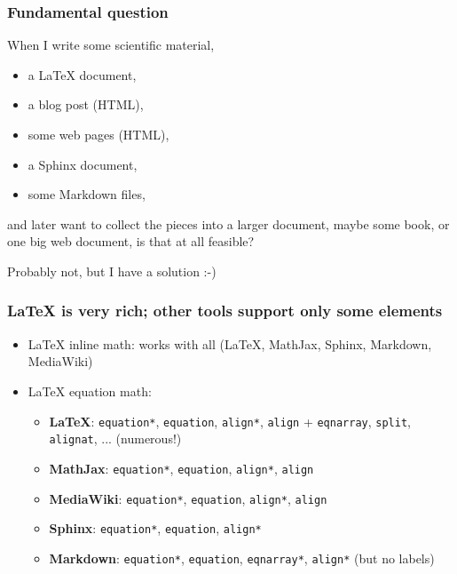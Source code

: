\documentclass{beamer}
\begin{document}
\begin{frame}
\frametitle{Fundamental question}

When I write some scientific material,

\begin{itemize}
 \item a {\LaTeX} document,

 \item a blog post (HTML),

 \item some web pages (HTML),

 \item a Sphinx document,

 \item some Markdown files,
\end{itemize}

\noindent
and later want to collect the pieces into a larger document, maybe
some book, or one big web document, is that at all feasible?

\pause
Probably not, but I have a solution :-)
\end{frame}

\begin{frame}
\frametitle{{\LaTeX} is very rich; other tools support only some elements}

\begin{itemize}
 \item {\LaTeX} inline math: works with all ({\LaTeX}, MathJax, Sphinx, Markdown, MediaWiki)

 \item {\LaTeX} equation math:
\begin{itemize}

    \item \textbf{LaTeX}: \texttt{equation*}, \texttt{equation}, \texttt{align*}, \texttt{align} + \texttt{eqnarray}, \texttt{split}, \texttt{alignat}, ... (numerous!)

    \item \textbf{MathJax}: \texttt{equation*}, \texttt{equation}, \texttt{align*}, \texttt{align}

    \item \textbf{MediaWiki}: \texttt{equation*}, \texttt{equation}, \texttt{align*}, \texttt{align}

    \item \textbf{Sphinx}: \texttt{equation*}, \texttt{equation}, \texttt{align*}

    \item \textbf{Markdown}: \texttt{equation*}, \texttt{equation}, \texttt{eqnarray*}, \texttt{align*} (but no labels)
\end{itemize}

\noindent
\end{itemize}

\noindent
\end{frame}
\end{document}
